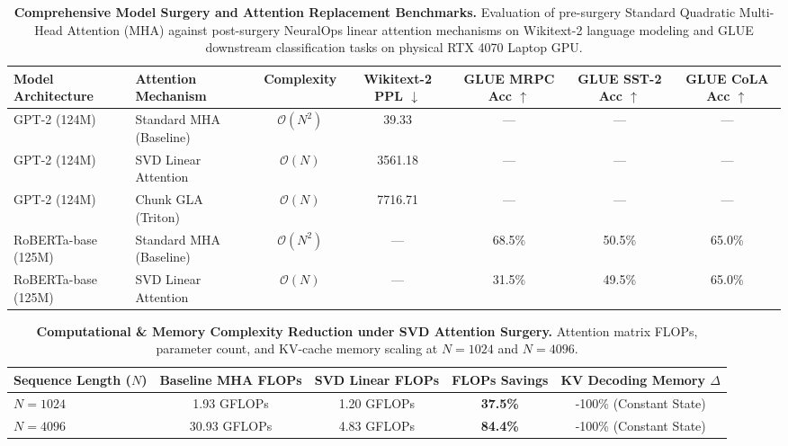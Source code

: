 \documentclass[journal]{IEEEtran}
\begin{document}

\begin{table}[t]
\centering
\small
\caption{\textbf{Comprehensive Model Surgery and Attention Replacement Benchmarks.} Evaluation of pre-surgery Standard Quadratic Multi-Head Attention (MHA) against post-surgery NeuralOps linear attention mechanisms on Wikitext-2 language modeling and GLUE downstream classification tasks on physical RTX 4070 Laptop GPU.}
\label{tab:model_surgery_benchmarks}
\begin{tabular}{llccccc}
\toprule
\textbf{Model Architecture} & \textbf{Attention Mechanism} & \textbf{Complexity} & \textbf{Wikitext-2 PPL} $\downarrow$ & \textbf{GLUE MRPC Acc} $\uparrow$ & \textbf{GLUE SST-2 Acc} $\uparrow$ & \textbf{GLUE CoLA Acc} $\uparrow$ \\
\midrule
GPT-2 (124M) & Standard MHA (Baseline) & $\mathcal{O}(N^2)$ & 39.33 & --- & --- & --- \\
GPT-2 (124M) & SVD Linear Attention & $\mathcal{O}(N)$ & 3561.18 & --- & --- & --- \\
GPT-2 (124M) & Chunk GLA (Triton) & $\mathcal{O}(N)$ & 7716.71 & --- & --- & --- \\
\midrule
RoBERTa-base (125M) & Standard MHA (Baseline) & $\mathcal{O}(N^2)$ & --- & 68.5\% & 50.5\% & 65.0\% \\
RoBERTa-base (125M) & SVD Linear Attention & $\mathcal{O}(N)$ & --- & 31.5\% & 49.5\% & 65.0\% \\
\bottomrule
\end{tabular}
\end{table}

\begin{table}[h]
\centering
\small
\caption{\textbf{Computational \& Memory Complexity Reduction under SVD Attention Surgery.} Attention matrix FLOPs, parameter count, and KV-cache memory scaling at $N=1024$ and $N=4096$.}
\label{tab:complexity_reduction}
\begin{tabular}{lcccc}
\toprule
\textbf{Sequence Length ($N$)} & \textbf{Baseline MHA FLOPs} & \textbf{SVD Linear FLOPs} & \textbf{FLOPs Savings} & \textbf{KV Decoding Memory $\Delta$} \\
\midrule
$N=1024$ & 1.93 GFLOPs & 1.20 GFLOPs & \textbf{37.5\%} & -100\% (Constant State) \\
$N=4096$ & 30.93 GFLOPs & 4.83 GFLOPs & \textbf{84.4\%} & -100\% (Constant State) \\
\bottomrule
\end{tabular}
\end{table}
\end{document}
